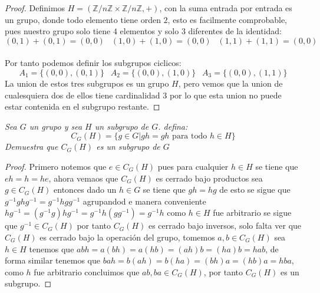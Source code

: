 \documentclass[11pt,letterpaper]{article}
\newcommand{\Z}{\mathbb{Z}}
\begin{document}
\begin{proof}
    Definimos $H=(\Z/n\Z\times \Z/n\Z,+)$, con la suma entrada por entrada es un grupo, donde todo elemento tiene orden $2$, esto es facilmente comprobable, pues nuestro grupo solo tiene $4$ elementos y solo $3$ diferentes de la identidad:\,\\
    \begin{equation*}
        (0,1)+(0,1)=(0,0)\,\,\:\:(1,0)+(1,0)=(0,0)\,\,\:\:(1,1)+(1,1)=(0,0)
    \end{equation*}\,\\
        Por tanto podemos definir los subgrupos ciclicos:\,\\
        \begin{equation*}
            A_1=\{(0,0),(0,1)\}\,\,\:\:A_2=\{(0,0),(1,0)\}\,\,\:\:A_3=\{(0,0),(1,1)\}
        \end{equation*}
        La union de estos tres subgrupos es un grupo $H$, pero vemos que la union de cualesquiera dos de ellos tiene cardinalidad $3$ por lo que esta union no puede estar contenida en el subgrupo restante.
\end{proof}
\begin{tcolorbox}[
	title = \textcolor{black}{\textcolor{white}{Problema 10}},]
\textit{Sea $G$ un grupo y sea $H$ un subgrupo de $G$. defina:
\begin{equation*}
    C_G(H)=\{g\in G|gh=gh\,\,\text{para todo}\,\,h\in H\}
\end{equation*}
Demuestra que $C_G(H)$ es un subgrupo de $G$
}
\end{tcolorbox}
\begin{proof}
    Primero notemos que $e\in C_G(H)$ pues para cualquier $h\in H$ se tiene que $eh=h=he$, ahora vemaos que $C_G(H)$ es cerrado bajo productos
    sea $g\in C_G(H)$ entonces dado un $h\in G$ se tiene que $gh=hg$ de esto se sigue que $g^{-1}ghg^{-1}=g^{-1}hgg^{-1}$ agrupandod e manera conveniente
    $hg^{-1}=(g^{-1}g)hg^{-1}=g^{-1}h(gg^{-1})=g^{-1}h$ como $h\in H$ fue arbitrario se sigue que $g^{-1}\in C_G(H)$ por tanto $C_G(H)$ es cerrado bajo inversos,
    solo falta ver que $C_G(H)$ es cerrado bajo la operaci\'on del grupo, tomemos $a,b\in C_G(H)$ sea $h\in H$ tenemos que $abh=a(bh)=a(hb)=(ah)b=(ha)b=hab$, de forma similar tenemos que
    $bah=b(ah)=b(ha)=(bh)a=(hb)a=hba$, como $h$ fue arbitrario concluimos que $ab,ba\in C_G(H)$, por tanto
    $C_G(H)$ es un subgrupo.
\end{proof}
\end{document}
